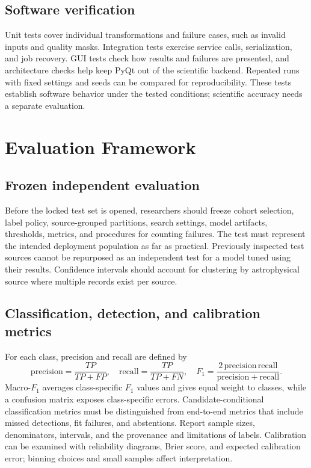 \documentclass[11pt,a4paper]{article}
\begin{document}
\subsection{Software verification}
Unit tests cover individual transformations and failure cases, such as invalid inputs and quality masks. Integration tests exercise service calls, serialization, and job recovery. GUI tests check how results and failures are presented, and architecture checks help keep PyQt out of the scientific backend. Repeated runs with fixed settings and seeds can be compared for reproducibility. These tests establish software behavior under the tested conditions; scientific accuracy needs a separate evaluation.

\section{Evaluation Framework}
\subsection{Frozen independent evaluation}
Before the locked test set is opened, researchers should freeze cohort selection, label policy, source-grouped partitions, search settings, model artifacts, thresholds, metrics, and procedures for counting failures. The test must represent the intended deployment population as far as practical. Previously inspected test sources cannot be repurposed as an independent test for a model tuned using their results. Confidence intervals should account for clustering by astrophysical source where multiple records exist per source.

\subsection{Classification, detection, and calibration metrics}
For each class, precision and recall are defined by
\begin{equation}
\mathrm{precision}=\frac{TP}{TP+FP},\quad
\mathrm{recall}=\frac{TP}{TP+FN},\quad
F_1=\frac{2\,\mathrm{precision}\,\mathrm{recall}}{\mathrm{precision}+\mathrm{recall}}.
\end{equation}
Macro-$F_1$ averages class-specific $F_1$ values and gives equal weight to classes, while a confusion matrix exposes class-specific errors. Candidate-conditional classification metrics must be distinguished from end-to-end metrics that include missed detections, fit failures, and abstentions. Report sample sizes, denominators, intervals, and the provenance and limitations of labels. Calibration can be examined with reliability diagrams, Brier score, and expected calibration error; binning choices and small samples affect interpretation.
\end{document}

